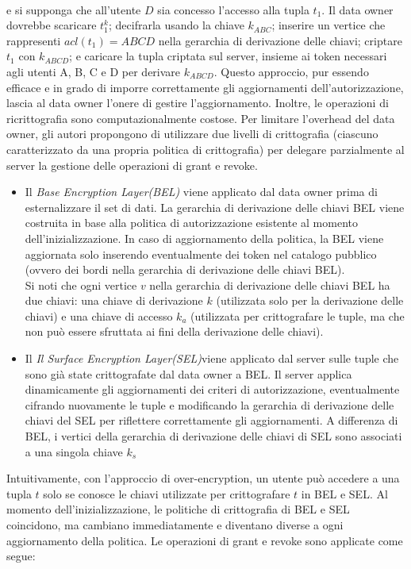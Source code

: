 \\
e si supponga che all'utente $D$ sia concesso l'accesso alla tupla $t_1$. Il data owner dovrebbe scaricare $t^k_1$; decifrarla usando la chiave $k_{ABC}$; inserire un vertice che rappresenti $acl(t_1)=ABCD$ nella gerarchia di derivazione delle chiavi; criptare $t_1$ con $k_{ABCD}$; e caricare la tupla criptata sul server, insieme ai token necessari agli utenti A, B, C e D per derivare $k_{ABCD}$. Questo approccio, pur essendo efficace e in grado di imporre correttamente gli aggiornamenti dell'autorizzazione, lascia al data owner l'onere di gestire l'aggiornamento. Inoltre, le operazioni di ricrittografia sono computazionalmente costose. Per limitare l'overhead del data owner, gli autori propongono di utilizzare due livelli di crittografia (ciascuno caratterizzato da una propria politica di crittografia) per delegare parzialmente al server la gestione delle operazioni di grant e revoke.
\begin{itemize}
    \item Il \textit{Base Encryption Layer(BEL)} viene applicato dal data owner prima di esternalizzare il set di dati. La gerarchia di derivazione delle chiavi BEL viene costruita in base alla politica di autorizzazione esistente al momento dell'inizializzazione. In caso di aggiornamento della politica, la BEL viene aggiornata solo inserendo eventualmente dei token nel catalogo pubblico (ovvero dei bordi nella gerarchia di derivazione delle chiavi BEL).\\
    Si noti che ogni vertice $v$ nella gerarchia di derivazione delle chiavi BEL ha due chiavi: una chiave di derivazione $k$ (utilizzata solo per la derivazione delle chiavi) e una chiave di accesso $k_a$ (utilizzata per crittografare le tuple, ma che non può essere sfruttata ai fini della derivazione delle chiavi).
    \item Il \textit{Il Surface Encryption Layer(SEL)}viene applicato dal server sulle tuple che sono già state crittografate dal data owner a BEL. Il server applica dinamicamente gli aggiornamenti dei criteri di autorizzazione, eventualmente cifrando nuovamente le tuple e modificando la gerarchia di derivazione delle chiavi del SEL per riflettere correttamente gli aggiornamenti. A differenza di BEL, i vertici della gerarchia di derivazione delle chiavi di SEL sono associati a una singola chiave $k_s$
\end{itemize}
Intuitivamente, con l'approccio di over-encryption, un utente può accedere a una tupla $t$ solo se conosce le chiavi utilizzate per crittografare $t$ in BEL e SEL. Al momento dell'inizializzazione, le politiche di crittografia di BEL e SEL coincidono, ma cambiano immediatamente e diventano diverse a ogni aggiornamento della politica. Le operazioni di grant e revoke sono applicate come segue:

